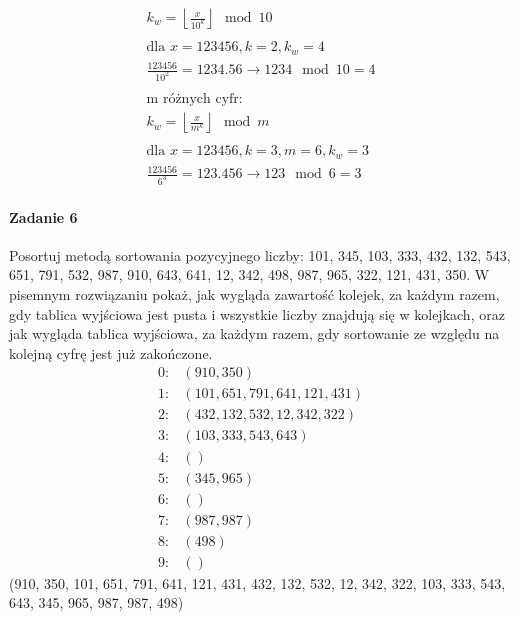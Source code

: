 \documentclass[18pt]{extarticle}
\begin{document}
\begin{gather*}
    k_w = \left \lfloor \frac{x}{10^k} \right \rfloor \mod 10 \\ \\
    \text{dla }x = 123456, k = 2, k_w = 4 \\ 
    \frac{123456}{10^2} = 1234.56 \rightarrow 1234 \mod 10 = 4 \\ \\
    \text{m różnych cyfr:} \\
    k_w = \left \lfloor \frac{x}{m^k} \right \rfloor \mod m \\ \\
    \text{dla }x = 123456, k = 3, m = 6, k_w = 3 \\
    \frac{123456}{6^3} = 123.456 \rightarrow 123 \mod 6 = 3
\end{gather*}

\pagebreak
\paragraph{Zadanie 6} Posortuj metodą sortowania pozycyjnego liczby: 101, 345, 103, 333, 432, 132, 543, 651, 791, 532, 987, 910, 643, 641, 12, 342, 498, 987, 965, 322, 121, 431, 350. W pisemnym rozwiązaniu pokaż, jak wygląda zawartość kolejek, za każdym razem, gdy tablica wyjściowa jest pusta i wszystkie liczby znajdują się w kolejkach, oraz jak wygląda tablica wyjściowa, za każdym razem, gdy sortowanie ze względu na kolejną cyfrę jest już zakończone.
\begin{align*}
    0: & \left(910, 350\right) \\
    1: & \left(101, 651, 791, 641, 121, 431\right) \\
    2: & \left(432, 132, 532, 12, 342, 322\right) \\
    3: & \left(103, 333, 543, 643\right) \\
    4: & \left(\right) \\
    5: & \left(345, 965\right) \\
    6: & \left(\right) \\
    7: & \left(987, 987\right) \\
    8: & \left(498\right) \\
    9: & \left(\right)
\end{align*}
(910, 350, 101, 651, 791, 641, 121, 431, 432, 132, 532, 12, 342, 322, 103, 333, 543, 643, 345, 965, 987, 987, 498)
\end{document}

